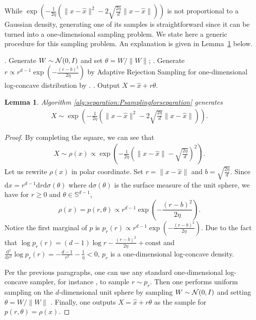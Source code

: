 \documentclass[11pt,letterpaper]{article}
\newcommand{\D}{\mathrm{d}}
\newcommand{\brac}[1]{\left( #1\right)}
\newtheorem{lemma}[thm]{Lemma}
\begin{document}
While $ \exp\brac{-\frac{1}{2\eta}\left(\|x-\hat x\|^2 - 2\sqrt{\frac{2\eta}{d} } \|x-\hat x\|\right)}$ is not proportional to a Gaussian density, generating one of its samples is straightforward since it can be turned into a one-dimensional sampling problem. We state here a generic procedure for this sampling problem. An explanation is given in Lemma~\ref{lem:proposalsampling} below. 
\begin{algorithm}[H]
	\caption{Sample $X\sim \exp\brac{-\frac{1}{2\eta}\left(\|x-\hat x\|^2 - 2\sqrt{\frac{2\eta}{d} } \|x-\hat x\|\right)}$ in Algorithm \ref{alg:RGO:uniform:separation}} 
	\label{alg:separation:Psamplingforseparation}
	\begin{algorithmic}
		. Generate $W\sim {\cal N}(0,I)$  and set $\theta = W/\|W\|$; 
		. Generate $r \propto r^{d-1} \exp\left(-\frac{(r-b)^2}{2\eta}\right)$ by Adaptive Rejection Sampling for one-dimensional log-concave distribution by \cite{gilks1992adaptive}. 
		. Output $X = \hat x + r \theta$.
	\end{algorithmic}
\end{algorithm}



\begin{lemma}
\label{lem:proposalsampling}
    Algorithm \ref{alg:separation:Psamplingforseparation} generates 
    \begin{align*}
        X\sim \exp\brac{-\frac{1}{2\eta}\left(\|x-\hat x\|^2 - 2\sqrt{\frac{2\eta}{d} } \|x-\hat x\|\right)}. 
    \end{align*}


\end{lemma}

\begin{proof} By completing the square, we can see that 
\begin{align*}
    X\sim \rho(x)\propto \exp\left(-\frac{1}{2\eta}\left(\|x-\hat x\| - \sqrt{\frac{2\eta}{d}}\right)^2\right). 
\end{align*}
Let us rewrite $\rho(x)$ in polar coordinate. Set $r = \|x-\hat x\|$ and $b = \sqrt{\frac{2\eta}{d}}$. Since $\D x = r^{d-1}\D r \D\sigma(\theta)$ where $\D\sigma(\theta)$ is the surface measure of the unit sphere, we have for $r\ge 0$ and $\theta \in \mathbb{S}^{d-1}$,
\[
\rho(x)=p(r,\theta) \propto r^{d-1} \exp\left(-\frac{(r-b)^2}{2\eta}\right). 
\]
Notice the first marginal of $p$ is $p_r(r) \propto r^{d-1} \exp\left(-\frac{(r-b)^2}{2\eta}\right)$. Due to the fact that $\log p_r(r)=(d-1) \log r-\frac{(r-b)^2}{2\eta} + \mbox{const}$ and $\frac{\D^2}{\D r^2} \log p_r(r)=-\frac{d-1}{r^2}-\frac{1}{\eta}<0$, $p_r$ is a one-dimensional log-concave density.

Per the previous paragraphs, one can use any standard one-dimensional log-concave sampler, for instance \cite{gilks1992adaptive}, to sample $r\sim p_r$. Then one performs uniform sampling on the $d$-dimensional unit sphere by sampling $W\sim {\cal N}(0,I)$ and setting $\theta = W/\|W\|$ \cite{muller1959note}. Finally, one outputs $X = \hat x + r \theta$ as the sample for $p(r,\theta)=\rho(x)$. 
\end{proof}
\end{document}
